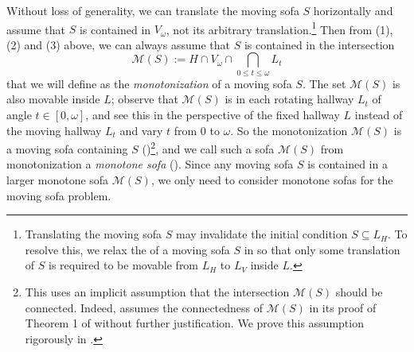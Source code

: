 Without loss of generality, we can translate the moving sofa \(S\) horizontally and assume that \(S\) is contained in \(V_\omega\), not its arbitrary translation.\footnote{Translating the moving sofa \(S\) may invalidate the initial condition \(S \subseteq L_H\). To resolve this, we relax the  of a moving sofa \(S\) in so that only some translation of \(S\) is required to be movable from \(L_H\) to \(L_V\) inside \(L\).} Then from (1), (2) and (3) above, we can always assume that \(S\) is contained in the intersection
\begin{equation}
\label{eqn:monotone}
\mathcal{M}(S) := H \cap V_\omega \cap \bigcap_{0 \leq t \leq \omega} L_t
\end{equation}
that we will define as the \emph{monotonization} of a moving sofa \(S\). The set \(\mathcal{M}(S)\) is also movable inside \(L\); observe that \(\mathcal{M}(S)\) is in each rotating hallway \(L_t\) of angle \(t \in [0, \omega]\), and see this in the perspective of the fixed hallway \(L\) instead of the moving hallway \(L_t\) and vary \(t\) from \(0\) to \(\omega\). So the monotonization \(\mathcal{M}(S)\) is a moving sofa containing \(S\) ()\footnote{This uses an implicit assumption that the intersection \(\mathcal{M}(S)\) should be connected. Indeed, \autocite{gerverMovingSofaCorner1992} assumes the connectedness of \(\mathcal{M}(S)\) in its proof of Theorem 1 of \autocite{gerverMovingSofaCorner1992} without further justification. We prove this assumption rigorously in .}, and we call such a sofa \(\mathcal{M}(S)\) from monotonization a \emph{monotone sofa} (). Since any moving sofa \(S\) is contained in a larger monotone sofa \(\mathcal{M}(S)\), we only need to consider monotone sofas for the moving sofa problem.